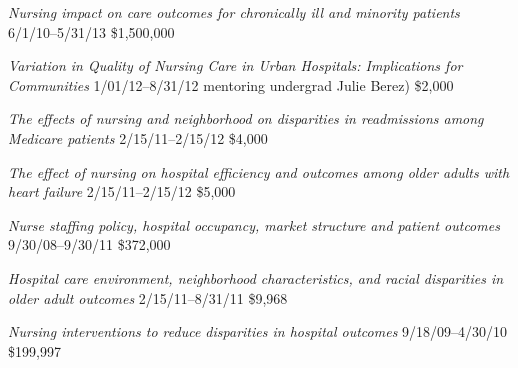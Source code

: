 \documentclass[10pt,]{article}
\begin{document}
{{{{{{{{{{{{{{\textit {Nursing impact on care outcomes for chronically ill and minority patients} \hfill 6/1/10--5/31/13 \newline
{}	\hfill \$1,500,000

\textit {Variation in Quality of Nursing Care in Urban Hospitals: Implications for Communities} \hfill 1/01/12--8/31/12 \newline
{ mentoring undergrad Julie Berez)} \hfill \$2,000

\textit {The effects of nursing and neighborhood on disparities in readmissions among Medicare patients} \hfill 2/15/11--2/15/12 \newline
{}	\hfill \$4,000

\textit {The effect of nursing on hospital efficiency and outcomes among older adults with heart failure} \hfill 2/15/11--2/15/12 \newline
{}	\hfill \$5,000

\textit {Nurse staffing policy, hospital occupancy, market structure and patient outcomes} \hfill 9/30/08--9/30/11 \newline
{}	\hfill \$372,000

\textit {Hospital care environment, neighborhood characteristics, and racial disparities in older adult outcomes} \hfill 2/15/11--8/31/11 \newline
{}	\hfill \$9,968

\textit {Nursing interventions to reduce disparities in hospital outcomes} \hfill 9/18/09--4/30/10 \newline
{}	\hfill \$199,997

}}}}}}}}}}}}}}
\end{document}
